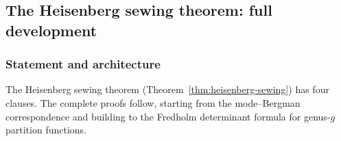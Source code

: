 %
%

\subsection{The Heisenberg sewing theorem: full development}
\label{subsec:thqg-X-heisenberg-sewing}

\subsubsection{Statement and architecture}

The Heisenberg sewing theorem
(Theorem~\ref{thm:heisenberg-sewing})
has four clauses. The complete proofs follow, starting
from the mode--Bergman correspondence and building to the
Fredholm determinant formula for genus-$g$ partition functions.

